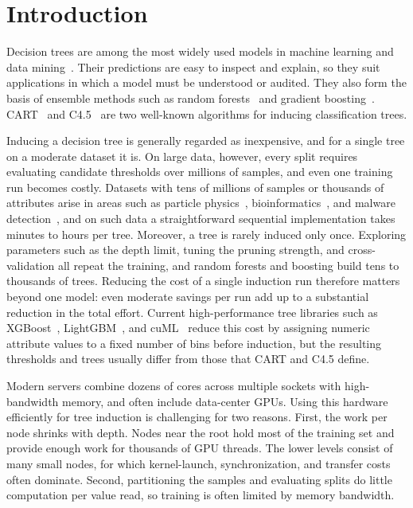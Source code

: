 \section{Introduction}
\label{sec:intro}

Decision trees are among the most widely used models in machine learning and data mining~\cite{costa2023survey}. Their predictions are easy to inspect and explain, so they suit applications in which a model must be understood or audited. They also form the basis of ensemble methods such as random forests~\cite{breiman2001rf} and gradient boosting~\cite{chen2016xgboost,ke2017lightgbm}. CART~\cite{breiman1984cart} and C4.5~\cite{quinlan1993c45} are two well-known algorithms for inducing classification trees.

Inducing a decision tree is generally regarded as inexpensive, and for a single tree on a moderate dataset it is. On large data, however, every split requires evaluating candidate thresholds over millions of samples, and even one training run becomes costly. Datasets with tens of millions of samples or thousands of attributes arise in areas such as particle physics~\cite{baldi2014higgs}, bioinformatics~\cite{triguero2015ecbdl}, and malware detection~\cite{harang2020sorel}, and on such data a straightforward sequential implementation takes minutes to hours per tree. Moreover, a tree is rarely induced only once. Exploring parameters such as the depth limit, tuning the pruning strength, and cross-validation all repeat the training, and random forests and boosting build tens to thousands of trees. Reducing the cost of a single induction run therefore matters beyond one model: even moderate savings per run add up to a substantial reduction in the total effort. Current high-performance tree libraries such as XGBoost~\cite{chen2016xgboost}, LightGBM~\cite{ke2017lightgbm}, and cuML~\cite{raschka2020cuml} reduce this cost by assigning numeric attribute values to a fixed number of bins before induction, but the resulting thresholds and trees usually differ from those that CART and C4.5 define.

Modern servers combine dozens of cores across multiple sockets with high-bandwidth memory, and often include data-center GPUs. Using this hardware efficiently for tree induction is challenging for two reasons. First, the work per node shrinks with depth. Nodes near the root hold most of the training set and provide enough work for thousands of GPU threads. The lower levels consist of many small nodes, for which kernel-launch, synchronization, and transfer costs often dominate. Second, partitioning the samples and evaluating splits do little computation per value read, so training is often limited by memory bandwidth.

